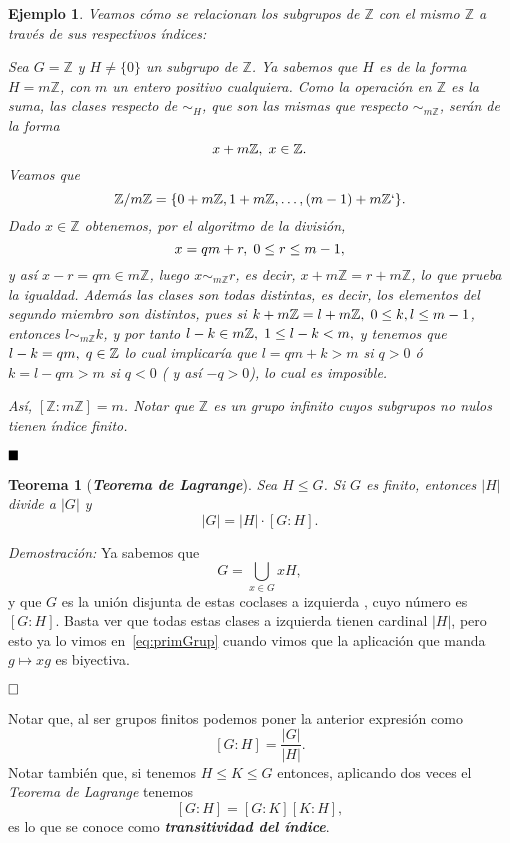 \documentclass[12pt]{article}
\newtheorem{theorem}{Teorema}[section]
\newtheorem{example}{Ejemplo}[theorem]
\begin{document}
\begin{example} Veamos cómo se relacionan los subgrupos de $\mathbb{Z}$ con el mismo $\mathbb{Z}$ a través de sus respectivos índices:

Sea $G = \mathbb{Z}$ y $H \neq \lbrace 0 \rbrace$ un subgrupo de $\mathbb{Z}$. Ya sabemos que $H$ es de la forma $H = m\mathbb{Z}$, con $m$ un entero positivo cualquiera. Como la operación en $\mathbb{Z}$ es la \textit{suma}, las clases respecto de $\sim_{H}$, que son las mismas que respecto $\sim_{m\mathbb{Z}}$, serán de la forma $$x+ m\mathbb{Z}, \hspace{0.1cm} x \in \mathbb{Z}.$$ Veamos que $$\mathbb{Z}/m\mathbb{Z} = \lbrace 0+m\mathbb{Z},1+ m\mathbb{Z}, \ldots,(m-1)+ m\mathbb{Z}`\rbrace.$$ Dado $x \in \mathbb{Z}$ obtenemos, por el algoritmo de la división, $$x = qm + r, \hspace{0.1cm} 0\leq r\leq m-1,$$y así $x-r = qm \in m\mathbb{Z}$, luego $x\sim_{m\mathbb{Z}}r$, es decir, $x+m\mathbb{Z}=r+ m\mathbb{Z}$, lo que prueba la igualdad. Además las clases son todas distintas, es decir, los elementos del segundo miembro son distintos, pues si $k+m\mathbb{Z} =l+ m\mathbb{Z}, \hspace{0.1cm} 0\leq k,l \leq m-1$, entonces $l\sim_{m\mathbb{Z}}k$, y por tanto $l-k \in m\mathbb{Z}, \hspace{0.1cm} 1\leq l-k <m,$ y tenemos que $l-k = qm, \hspace{0.1cm} q \in \mathbb{Z}$ lo cual implicaría que $l = qm +k > m$ si $q>0$ ó $k = l - qm >m$ si $q < 0$ ( y así $-q >0$), lo cual es imposible.

Así, $\left[ \mathbb{Z}:m\mathbb{Z} \right] = m$. Notar que $\mathbb{Z}$ es un grupo infinito cuyos subgrupos no nulos tienen índice finito.
\end{example}
$\hfill \blacksquare$

\begin{theorem}[\textbf{\textit{Teorema de Lagrange}}]
Sea $H \leq G$. Si $G$ es finito, entonces $|H|$ divide a $|G|$ y $$|G| = |H|\cdot \left[ G:H \right].$$
\end{theorem}
\emph{Demostración: }Ya sabemos que $$G = \bigcup_{x\in G} xH,$$ y que $G$ es la unión disjunta de estas coclases a izquierda , cuyo número es $[G:H]$. Basta ver que todas estas clases a izquierda tienen cardinal $|H|$, pero esto ya lo vimos en~\ref{eq:primGrup} cuando vimos que la aplicación que manda $g \longmapsto xg$ es biyectiva.

$\hfill \square$

Notar que, al ser grupos finitos podemos poner la anterior expresión como $$[G:H] = \dfrac{|G|}{|H|}.$$
Notar también que, si tenemos $H \leq K \leq G$ entonces, aplicando dos veces el \textit{Teorema de Lagrange} tenemos $$[G:H]=[G:K][K:H],$$ es lo que se conoce como \textbf{\textit{transitividad del índice}}.
\end{document}
